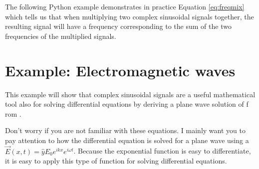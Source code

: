 The following Python example demonstrates in practice
Equation \ref{eq:freqmix} which tells us that when multiplying two
complex sinusoidal signals together, the resulting signal will have a frequency corresponding to the sum of the two frequencies of the multiplied signals.



\section{Example: Electromagnetic waves}
\label{waveeq}

This example will show that complex sinusoidal signals are a useful
mathematical tool also for solving differential equations by deriving a
plane wave solution of  f
rom .

Don't worry if you are not familiar with these equations. I mainly want you to pay attention to
how the differential equation is solved for a plane wave using a
$\vec{E}(x,t)=\hat{y}E_0 e^{i k x}e^{i\omega t}$. Because the exponential function is easy to differentiate,
it is easy to apply this type of function for solving differential equations.


